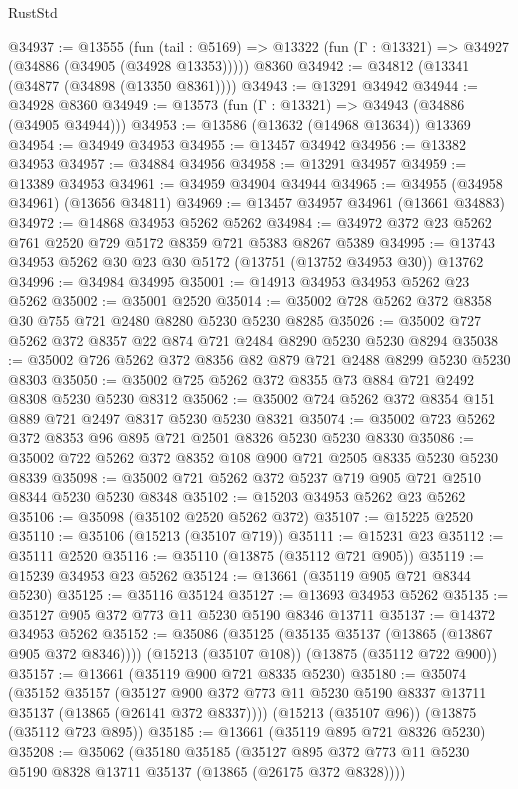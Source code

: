 \begin{lexlean}{RustStd}
\begin{coremodule}
@34937 := @13555
    (fun (tail : @5169) => @13322 (fun (Γ : @13321) => @34927 (@34886 (@34905 (@34928 @13353)))))
    @8360
@34942 := @34812 (@13341 (@34877 (@34898 (@13350 @8361))))
@34943 := @13291 @34942
@34944 := @34928 @8360
@34949 := @13573 (fun (Γ : @13321) => @34943 (@34886 (@34905 @34944)))
@34953 := @13586 (@13632 (@14968 @13634)) @13369
@34954 := @34949 @34953
@34955 := @13457 @34942
@34956 := @13382 @34953
@34957 := @34884 @34956
@34958 := @13291 @34957
@34959 := @13389 @34953
@34961 := @34959 @34904 @34944
@34965 := @34955 (@34958 @34961) (@13656 @34811)
@34969 := @13457 @34957 @34961 (@13661 @34883)
@34972 := @14868 @34953 @5262 @5262
@34984 := @34972 @372 @23 @5262 @761 @2520 @729 @5172 @8359 @721 @5383 @8267 @5389
@34995 := @13743 @34953 @5262 @30 @23 @30 @5172 (@13751 (@13752 @34953 @30)) @13762
@34996 := @34984 @34995
@35001 := @14913 @34953 @34953 @5262 @23 @5262
@35002 := @35001 @2520
@35014 := @35002 @728 @5262 @372 @8358 @30 @755 @721 @2480 @8280 @5230 @5230 @8285
@35026 := @35002 @727 @5262 @372 @8357 @22 @874 @721 @2484 @8290 @5230 @5230 @8294
@35038 := @35002 @726 @5262 @372 @8356 @82 @879 @721 @2488 @8299 @5230 @5230 @8303
@35050 := @35002 @725 @5262 @372 @8355 @73 @884 @721 @2492 @8308 @5230 @5230 @8312
@35062 := @35002 @724 @5262 @372 @8354 @151 @889 @721 @2497 @8317 @5230 @5230 @8321
@35074 := @35002 @723 @5262 @372 @8353 @96 @895 @721 @2501 @8326 @5230 @5230 @8330
@35086 := @35002 @722 @5262 @372 @8352 @108 @900 @721 @2505 @8335 @5230 @5230 @8339
@35098 := @35002 @721 @5262 @372 @5237 @719 @905 @721 @2510 @8344 @5230 @5230 @8348
@35102 := @15203 @34953 @5262 @23 @5262
@35106 := @35098 (@35102 @2520 @5262 @372)
@35107 := @15225 @2520
@35110 := @35106 (@15213 (@35107 @719))
@35111 := @15231 @23
@35112 := @35111 @2520
@35116 := @35110 (@13875 (@35112 @721 @905))
@35119 := @15239 @34953 @23 @5262
@35124 := @13661 (@35119 @905 @721 @8344 @5230)
@35125 := @35116 @35124
@35127 := @13693 @34953 @5262
@35135 := @35127 @905 @372 @773 @11 @5230 @5190 @8346 @13711
@35137 := @14372 @34953 @5262
@35152 := @35086
    (@35125 (@35135 @35137 (@13865 (@13867 @905 @372 @8346))))
    (@15213 (@35107 @108))
    (@13875 (@35112 @722 @900))
@35157 := @13661 (@35119 @900 @721 @8335 @5230)
@35180 := @35074
    (@35152
      @35157
      (@35127 @900 @372 @773 @11 @5230 @5190 @8337 @13711 @35137 (@13865 (@26141 @372 @8337))))
    (@15213 (@35107 @96))
    (@13875 (@35112 @723 @895))
@35185 := @13661 (@35119 @895 @721 @8326 @5230)
@35208 := @35062
    (@35180
      @35185
      (@35127 @895 @372 @773 @11 @5230 @5190 @8328 @13711 @35137 (@13865 (@26175 @372 @8328))))

\end{coremodule}
\end{lexlean}
